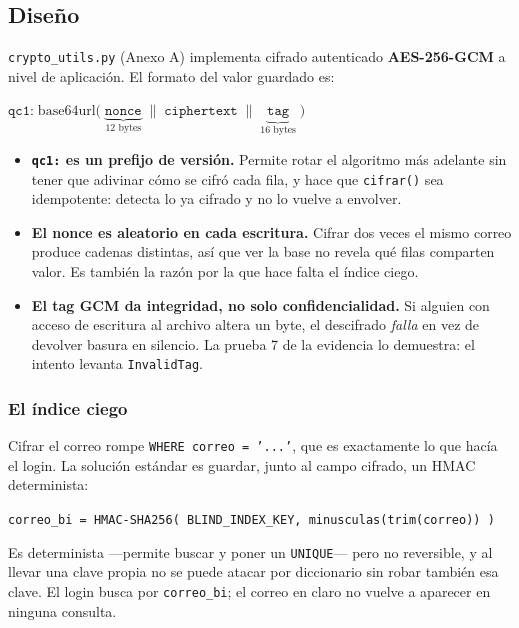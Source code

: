 \documentclass[11pt,letterpaper]{article}
\begin{document}
\subsection{Diseño}

\texttt{crypto\_utils.py} (Anexo A) implementa cifrado autenticado
\textbf{AES-256-GCM} a nivel de aplicación. El formato del valor guardado es:

\begin{center}
$\texttt{qc1:}\;\mathrm{base64url}\big(\;
\underbrace{\texttt{nonce}}_{12\text{ bytes}}\;\|\;
\texttt{ciphertext}\;\|\;
\underbrace{\texttt{tag}}_{16\text{ bytes}}\;\big)$
\end{center}

\begin{itemize}[leftmargin=1.4em,itemsep=4pt]
  \item \textbf{\texttt{qc1:} es un prefijo de versión.} Permite rotar el
        algoritmo más adelante sin tener que adivinar cómo se cifró cada fila,
        y hace que \texttt{cifrar()} sea idempotente: detecta lo ya cifrado y
        no lo vuelve a envolver.
  \item \textbf{El nonce es aleatorio en cada escritura.} Cifrar dos veces el
        mismo correo produce cadenas distintas, así que ver la base no revela
        qué filas comparten valor. Es también la razón por la que hace falta el
        índice ciego.
  \item \textbf{El tag GCM da integridad, no solo confidencialidad.} Si alguien
        con acceso de escritura al archivo altera un byte, el descifrado
        \emph{falla} en vez de devolver basura en silencio. La prueba 7 de la
        evidencia lo demuestra: el intento levanta \texttt{InvalidTag}.
\end{itemize}

\subsubsection*{El índice ciego}

Cifrar el correo rompe \texttt{WHERE correo = '...'}, que es exactamente lo que
hacía el login. La solución estándar es guardar, junto al campo cifrado, un
HMAC determinista:

\begin{center}
\texttt{correo\_bi = HMAC-SHA256( BLIND\_INDEX\_KEY, minusculas(trim(correo)) )}
\end{center}

Es determinista —permite buscar y poner un \texttt{UNIQUE}— pero no reversible,
y al llevar una clave propia no se puede atacar por diccionario sin robar
también esa clave. El login busca por \texttt{correo\_bi}; el correo en claro
no vuelve a aparecer en ninguna consulta.
\end{document}
